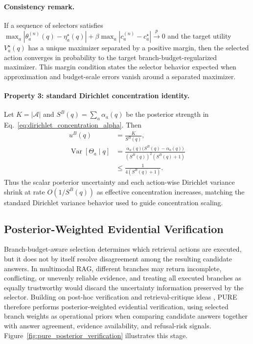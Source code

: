 \documentclass[a4paper,fleqn]{cas-dc}
\begin{document}
\paragraph{Consistency remark.}
If a sequence of selectors satisfies $\max_a|\theta_a^{(n)}(q)-\eta_a^\star(q)|+\beta\max_a|c_a^{(n)}-c_a^\star|\xrightarrow{p}0$ and the target utility $V_a^\star(q)$ has a unique maximizer separated by a positive margin, then the selected action converges in probability to the target branch-budget-regularized maximizer. This margin condition states the selector behavior expected when approximation and budget-scale errors vanish around a separated maximizer.

\paragraph{Property 3: standard Dirichlet concentration identity.}
Let $K=|\mathcal{A}|$ and $S^B(q)=\sum_a\alpha_a(q)$ be the posterior strength in Eq.~\eqref{eq:dirichlet_concentration_alpha}. Then
\begin{equation}
\label{eq:uncertainty_concentration}
\begin{aligned}
u^B(q)
&=\frac{K}{S^B(q)},\\
\operatorname{Var}[\Theta_a\mid q]
&=
\frac{\alpha_a(q)\big(S^B(q)-\alpha_a(q)\big)}
{(S^B(q))^2(S^B(q)+1)}\\
&\le \frac{1}{4(S^B(q)+1)}.
\end{aligned}
\end{equation}
Thus the scalar posterior uncertainty and each action-wise Dirichlet variance shrink at rate $O(1/S^B(q))$ as effective concentration increases, matching the standard Dirichlet variance behavior used to guide concentration scaling.

\subsection{Posterior-Weighted Evidential Verification}
\label{subsec:posterior_verification}

Branch-budget-aware selection determines which retrieval actions are executed, but it does not by itself resolve disagreement among the resulting candidate answers. In multimodal RAG, different branches may return incomplete, conflicting, or unevenly reliable evidence, and treating all executed branches as equally trustworthy would discard the uncertainty information preserved by the selector. Building on post-hoc verification and retrieval-critique ideas \citep{Asai2023SelfRAG,Yan2024CorrectiveRAG,Madaan2023SelfRefine}, PURE therefore performs posterior-weighted evidential verification, using selected branch weights as operational priors when comparing candidate answers together with answer agreement, evidence availability, and refusal-risk signals. Figure~\ref{fig:pure_posterior_verification} illustrates this stage.
\end{document}
